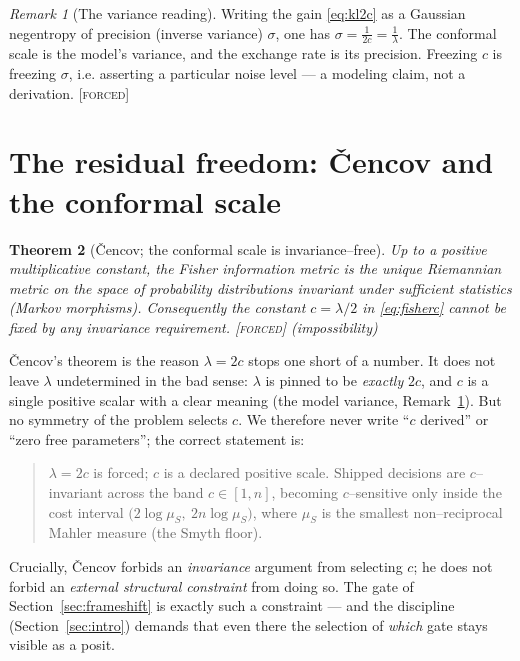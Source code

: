 \documentclass[11pt]{article}
\theoremstyle{plain}
\newtheorem{theorem}{Theorem}[section]
\theoremstyle{definition}
\theoremstyle{remark}
\newtheorem{remark}[theorem]{Remark}
\newcommand{\forced}{\textcolor{forcedc}{\textsc{[forced]}}}
\begin{document}
\begin{remark}[The variance reading]\label{rem:sigma}
Writing the gain \eqref{eq:kl2c} as a Gaussian negentropy of precision (inverse variance) $\sigma$, one has $\sigma = \tfrac{1}{2c} = \tfrac1\lambda$. The conformal scale is the model's variance, and the exchange rate is its precision. Freezing $c$ is freezing $\sigma$, i.e. asserting a particular noise level --- a modeling claim, not a derivation. \forced
\end{remark}

\section{The residual freedom: \texorpdfstring{\v{C}encov}{Cencov} and the conformal scale}\label{sec:cencov}

\begin{theorem}[\v{C}encov; the conformal scale is invariance--free]\label{thm:cencov}
Up to a positive multiplicative constant, the Fisher information metric is the unique Riemannian metric on the space of probability distributions invariant under sufficient statistics (Markov morphisms). Consequently the constant $c=\lambda/2$ in \eqref{eq:fisherc} \emph{cannot} be fixed by any invariance requirement. \forced{} (impossibility)
\end{theorem}

\v{C}encov's theorem is the reason $\lambda=2c$ stops one short of a number. It does not leave $\lambda$ undetermined in the bad sense: $\lambda$ is pinned to be \emph{exactly} $2c$, and $c$ is a single positive scalar with a clear meaning (the model variance, Remark~\ref{rem:sigma}). But no symmetry of the problem selects $c$. We therefore never write ``$c$ derived'' or ``zero free parameters''; the correct statement is:
\begin{quote}
$\lambda = 2c$ is forced; $c$ is a declared positive scale. Shipped decisions are $c$--invariant across the band $c\in[1,n]$, becoming $c$--sensitive only inside the cost interval $\bigl(2\log\mu_S,\ 2n\log\mu_S\bigr)$, where $\mu_S$ is the smallest non--reciprocal Mahler measure (the Smyth floor).
\end{quote}
Crucially, \v{C}encov forbids an \emph{invariance} argument from selecting $c$; he does not forbid an \emph{external structural constraint} from doing so. The gate of Section~\ref{sec:frameshift} is exactly such a constraint --- and the discipline (Section~\ref{sec:intro}) demands that even there the selection of \emph{which} gate stays visible as a posit.
\end{document}
